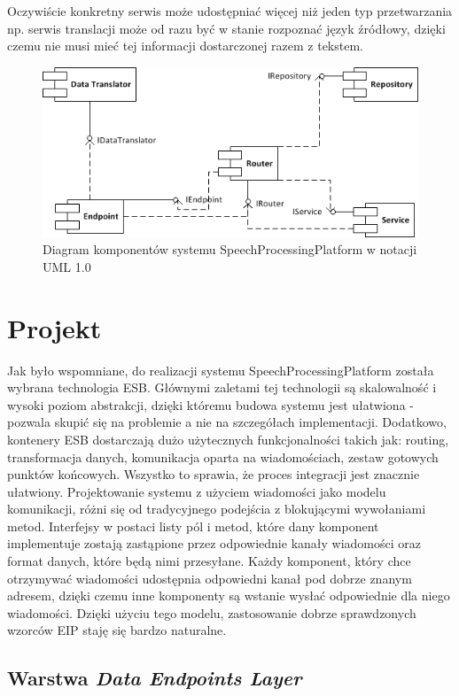 Oczywiście konkretny serwis może udostępniać więcej niż jeden typ przetwarzania np. serwis translacji może od razu być w stanie rozpoznać język źródłowy, dzięki czemu nie musi mieć tej informacji dostarczonej razem z tekstem.

\begin{figure}[!h]
	\centering
	\includegraphics[scale=1.0]{component_uml.png}
	\caption{Diagram komponentów systemu SpeechProcessingPlatform w notacji UML 1.0}\label{fig:component_diagram}
\end{figure}

\section{Projekt}

Jak było wspomniane, do realizacji systemu SpeechProcessingPlatform została wybrana technologia ESB. Głównymi zaletami tej technologii są skalowalność i wysoki poziom abstrakcji, dzięki któremu budowa systemu jest ułatwiona - pozwala skupić się na problemie a nie na szczegółach implementacji. Dodatkowo, kontenery ESB dostarczają dużo użytecznych funkcjonalności takich jak: routing, transformacja danych, komunikacja oparta na wiadomościach, zestaw gotowych punktów końcowych. Wszystko to sprawia, że proces integracji jest znacznie ułatwiony. Projektowanie systemu z użyciem wiadomości jako modelu komunikacji, różni się od tradycyjnego podejścia z blokującymi wywołaniami metod. Interfejsy w postaci listy pól i metod, które dany komponent implementuje zostają zastąpione przez odpowiednie kanały wiadomości oraz format danych, które będą nimi przesyłane. Każdy komponent, który chce otrzymywać wiadomości udostępnia odpowiedni kanał pod dobrze znanym adresem, dzięki czemu inne komponenty są wstanie wysłać odpowiednie dla niego wiadomości. Dzięki użyciu tego modelu, zastosowanie dobrze sprawdzonych wzorców EIP staję się bardzo naturalne. 

\subsection{Warstwa \textit{Data Endpoints Layer}}

